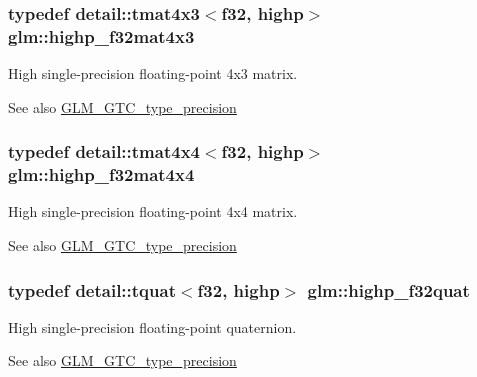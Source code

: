 \subsubsection[{\texorpdfstring{highp\+\_\+f32mat4x3}{highp_f32mat4x3}}]{\setlength{\rightskip}{0pt plus 5cm}typedef detail\+::tmat4x3$<$f32, highp$>$ {\bf glm\+::highp\+\_\+f32mat4x3}}\hypertarget{group__gtc__type__precision_ga5bd692575886422f501a379386e391d9}{}\label{group__gtc__type__precision_ga5bd692575886422f501a379386e391d9}
High single-\/precision floating-\/point 4x3 matrix. \begin{DoxySeeAlso}{See also}
\hyperlink{group__gtc__type__precision}{G\+L\+M\+\_\+\+G\+T\+C\+\_\+type\+\_\+precision} 
\end{DoxySeeAlso}
\subsubsection[{\texorpdfstring{highp\+\_\+f32mat4x4}{highp_f32mat4x4}}]{\setlength{\rightskip}{0pt plus 5cm}typedef detail\+::tmat4x4$<$f32, highp$>$ {\bf glm\+::highp\+\_\+f32mat4x4}}\hypertarget{group__gtc__type__precision_gafe24f12e4f5453058caea3f583ad7d9c}{}\label{group__gtc__type__precision_gafe24f12e4f5453058caea3f583ad7d9c}
High single-\/precision floating-\/point 4x4 matrix. \begin{DoxySeeAlso}{See also}
\hyperlink{group__gtc__type__precision}{G\+L\+M\+\_\+\+G\+T\+C\+\_\+type\+\_\+precision} 
\end{DoxySeeAlso}
\subsubsection[{\texorpdfstring{highp\+\_\+f32quat}{highp_f32quat}}]{\setlength{\rightskip}{0pt plus 5cm}typedef detail\+::tquat$<$f32, highp$>$ {\bf glm\+::highp\+\_\+f32quat}}\hypertarget{group__gtc__type__precision_ga26eef27d2efbd759e7e93c40672402e9}{}\label{group__gtc__type__precision_ga26eef27d2efbd759e7e93c40672402e9}
High single-\/precision floating-\/point quaternion. \begin{DoxySeeAlso}{See also}
\hyperlink{group__gtc__type__precision}{G\+L\+M\+\_\+\+G\+T\+C\+\_\+type\+\_\+precision} 
\end{DoxySeeAlso}
